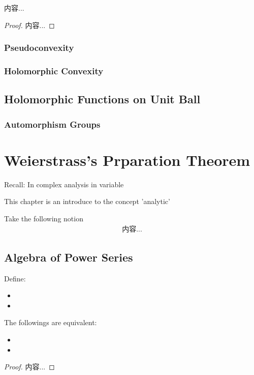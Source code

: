 \documentclass[Total.tex]{subfiles}
\begin{document}
			\begin{theorem}
				内容...
			\end{theorem}
			\begin{proof}
				内容...
			\end{proof}
			
		\subsection{Pseudoconvexity}
		\subsection{Holomorphic Convexity}
		\section{Holomorphic Functions on Unit Ball}
		\subsection{Automorphism Groups}
	\chapter{Weierstrass's Prparation Theorem}
		Recall: In complex analysis in variable
		\begin{theorem}
			
		\end{theorem}
		
		This chapter is an introduce to the concept 'analytic'
		
		Take the following notion 
		\begin{gather*}
			内容...
		\end{gather*}
		
		\section{Algebra of Power Series}
			\begin{Def}
				Define:
				\begin{itemize}
					\item 
					\item 
				\end{itemize}
			\end{Def}
			
			\begin{proposition}
				The followings are equivalent:
				\begin{itemize}
					\item 
					\item 
				\end{itemize}
			\end{proposition}
			\begin{proof}
				内容...
			\end{proof}
			
\end{document}
